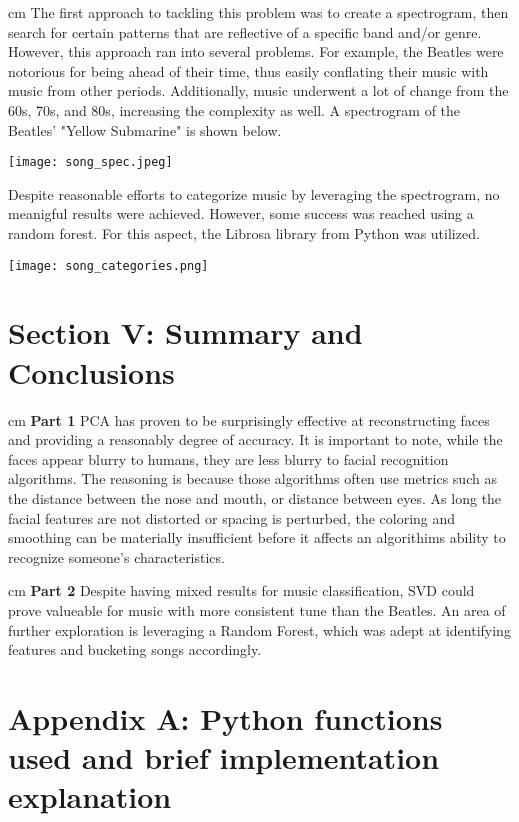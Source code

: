 \documentclass{cup-pan}
\begin{document}
 cm
\noindent
The first approach to tackling this problem was to create a spectrogram, then search for certain patterns that are reflective of a specific band and/or genre.  However, this approach ran into several problems.  For example, the Beatles were notorious for being ahead of their time, thus easily conflating their music with music from other periods.  Additionally, music underwent a lot of change from the 60s, 70s, and 80s, increasing the complexity as well. A spectrogram of the Beatles' "Yellow Submarine" is shown below.

\begin{center}
\texttt{[image: song\_spec.jpeg]}
\end{center}
Despite reasonable efforts to categorize music by leveraging the spectrogram, no meanigful results were achieved.  However, some success was reached using a random forest. For this aspect, the Librosa library from Python was utilized.  
\begin{center}
\texttt{[image: song\_categories.png]}
\end{center}
\section{Section V: Summary and Conclusions}


 cm
\noindent
\textbf{Part 1}
\noindent
PCA has proven to be surprisingly effective at reconstructing faces and providing a reasonably degree of accuracy.  It is important to note, while the faces appear blurry to humans, they are less blurry to facial recognition algorithms.  The reasoning is because those algorithms often use metrics such as the distance between the nose and mouth, or distance between eyes.  As long the facial features are not distorted or spacing is perturbed, the coloring and smoothing can be materially insufficient before it affects an algorithims ability to recognize someone's characteristics.  

 cm
\noindent
\textbf{Part 2}
\noindent
Despite having mixed results for music classification, SVD could prove valueable for music with more consistent tune than the Beatles.  An area of further exploration is leveraging a Random Forest, which was adept at identifying features and bucketing songs accordingly. 

\section{Appendix A: Python functions used and brief implementation explanation}
\end{document}
